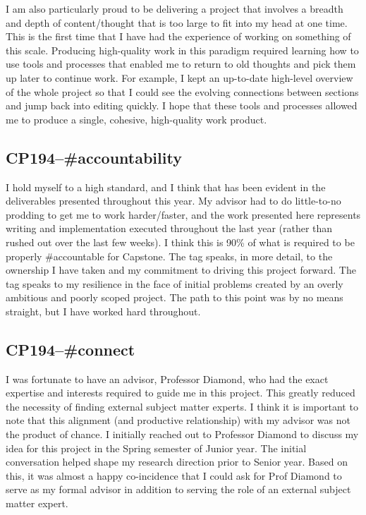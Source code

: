 \documentclass[../main.tex]{subfiles}
\begin{document}
\vspace{\baselineskip}

I am also particularly proud to be delivering a project that involves a breadth and depth of content/thought that is too large to fit into my head at one time. This is the first time that I have had the experience of working on something of this scale. Producing high-quality work in this paradigm required learning how to use tools and processes that enabled me to return to old thoughts and pick them up later to continue work. For example, I kept an up-to-date high-level overview of the whole project so that I could see the evolving connections between sections and jump back into editing quickly. I hope that these tools and processes allowed me to produce a single, cohesive, high-quality work product.

\subsection*{\textbf{CP194--\#accountability}}

I hold myself to a high standard, and I think that has been evident in the deliverables presented throughout this year. My advisor had to do little-to-no prodding to get me to work harder/faster, and the work presented here represents writing and implementation executed throughout the last year (rather than rushed out over the last few weeks). I think this is 90\% of what is required to be properly \#accountable for Capstone. The  tag speaks, in more detail, to the ownership I have taken and my commitment to driving this project forward. The  tag speaks to my resilience in the face of initial problems created by an overly ambitious and poorly scoped project. The path to this point was by no means straight, but I have worked hard throughout.

\subsection*{\textbf{CP194--\#connect}}

I was fortunate to have an advisor, Professor Diamond, who had the exact expertise and interests required to guide me in this project. This greatly reduced the necessity of finding external subject matter experts. I think it is important to note that this alignment (and productive relationship) with my advisor was not the product of chance. I initially reached out to Professor Diamond to discuss my idea for this project in the Spring semester of Junior year. The initial conversation helped shape my research direction prior to Senior year. Based on this, it was almost a happy co-incidence that I could ask for Prof Diamond to serve as my formal advisor in addition to serving the role of an external subject matter expert.
\end{document}
